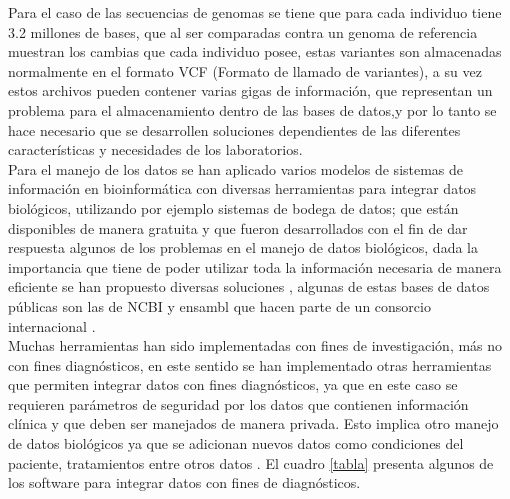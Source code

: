 Para el caso de las secuencias de genomas se tiene que para cada individuo tiene 3.2 millones de bases, que al ser comparadas contra un genoma de referencia muestran los cambias que cada individuo posee, estas variantes son almacenadas normalmente en el formato VCF (Formato de llamado de variantes), a su vez estos archivos pueden contener varias gigas de información, que representan un problema para el almacenamiento dentro de las bases de datos,y por lo tanto se hace necesario que se desarrollen soluciones dependientes de las diferentes características y necesidades de los laboratorios\cite{Kutzera2017}.\\

Para el manejo de los datos se han aplicado varios modelos de sistemas de información en  bioinformática con diversas herramientas para integrar datos biológicos, utilizando por ejemplo sistemas de bodega de datos; que están disponibles de manera gratuita y que fueron desarrollados con el fin de dar respuesta algunos de los problemas en el manejo de datos biológicos, dada la importancia que tiene de poder utilizar toda la información necesaria de manera eficiente se han propuesto diversas soluciones \cite{Triplet2014}, algunas de estas bases de datos públicas son las de NCBI y ensambl  que hacen parte de un consorcio internacional \cite{Sherry2001,Yates2016}.\\

Muchas  herramientas han sido implementadas con fines de investigación, más no con fines diagnósticos,  en este sentido se han implementado otras herramientas que permiten integrar datos con fines diagnósticos, ya que en este caso se requieren parámetros de seguridad por los datos que contienen información clínica y que deben ser manejados de manera privada. Esto implica otro manejo de datos biológicos ya que se adicionan nuevos datos como condiciones del paciente, tratamientos entre otros datos \cite{Canuel2015}. El cuadro \ref{tabla} presenta algunos de los software para integrar datos con fines de diagnósticos.\\

